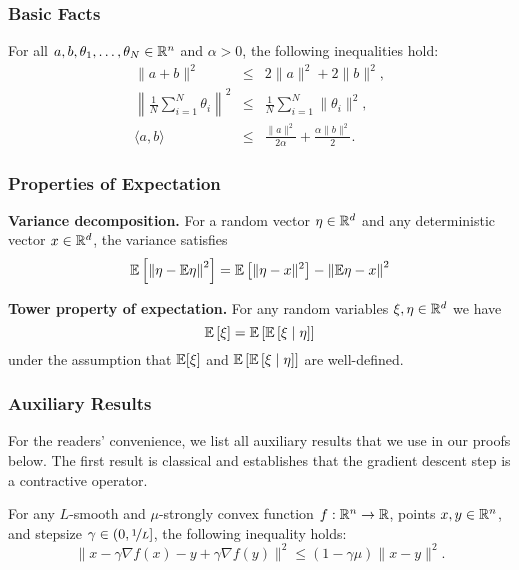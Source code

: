 \subsubsection{Basic Facts}
For all $a,b,\theta_1,\ldots,\theta_N\in\mathbb{R}^n$ and $\alpha > 0$, the following inequalities hold:
\begin{eqnarray}
    \|a+b\|^2 &\le& 2\|a\|^2 + 2\|b\|^2, \label{eq:a+b}\\
    \left\|\frac{1}{N}\sum\limits_{i=1}^N\theta_i\right\|^2 &\le& \frac{1}{N}\sum\limits_{i=1}^N\|\theta_i\|^2, \label{eq:jensen_ineq}\\
    \langle a,b\rangle &\le& \frac{\|a\|^2}{2\alpha} + \frac{\alpha\|b\|^2}{2}. \label{eq:young_inequality}
\end{eqnarray}

\subsubsection{Properties of Expectation}
\textbf{Variance decomposition.} For a random vector $\eta \in \mathbb{R}^d$ and any deterministic vector $x \in \mathbb{R}^d$, the variance satisfies
\begin{equation}\label{eq:variance_decomposition}
	\mathbb{E}\left[\left\|\eta - \mathbb{E}\eta\right\|^2\right] = \mathbb{E}\left[\|\eta-x\|^2\right] - \left\|\mathbb{E}\eta - x\right\|^2
\end{equation}

\textbf{Tower property of expectation.} For any random variables $\xi,\eta\in \mathbb{R}^d$ we have
\begin{equation}
	\mathbb{E}\left[\xi\right] = \mathbb{E}\left[\mathbb{E}\left[\xi\mid \eta\right]\right]\label{eq:tower_property}
\end{equation}
under the assumption that $\mathbb{E}[\xi]$ and $\mathbb{E}\left[\mathbb{E}\left[\xi\mid \eta\right]\right]$ are well-defined.

\subsubsection{Auxiliary Results}
For the readers' convenience, we list all auxiliary results that we use in our proofs below. The first result is classical and establishes that the gradient descent step is a contractive operator.
\begin{lemma}\label{lem:gd_contraction}
    For any $L$-smooth and $\mu$-strongly convex function $f:\mathbb{R}^n\to\mathbb{R}$, points $x,y\in \mathbb{R}^n$, and stepsize $\gamma \in (0,\nicefrac{1}{L}]$, the following inequality holds:
    \begin{equation}
        \|x - \gamma\nabla f(x) - y + \gamma\nabla f(y)\|^2 \le (1-\gamma\mu)\|x-y\|^2. \label{eq:gd_contraction}
    \end{equation}
\end{lemma}

